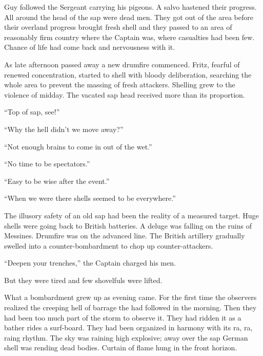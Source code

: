 Guy followed the Sergeant carrying his pigeons. A salvo hastened their progress. All around the head of the sap were dead men. They got out of the area before their overland progress brought fresh shell and they passed to an area of reasonably firm country where the Captain was, where casualties had been few. Chance of life had come back and nervousness with it.

As late afternoon passed away a new drumfire commenced. Fritz, fearful of renewed concentration, started to shell with bloody deliberation, searching the whole area to prevent the massing of fresh attackers. Shelling grew to the violence of midday. The vacated sap head received more than its proportion.

``Top of sap, see!''

``Why the hell didn't we move away?''

``Not enough brains to come in out of the wet.''

``No time to be spectators.''

``Easy to be wise after the event.''

``When we were there shells seemed to be everywhere.''

The illusory safety of an old sap had been the reality of a measured target. Huge shells were going back to British batteries. A deluge was falling on the ruins of Messines. Drumfire was on the advanced line. The British artillery gradually swelled into a counter-bombardment to chop up counter-attackers.

``Deepen your trenches,'' the Captain charged his men.

But they were tired and few shovelfuls were lifted.

What a bombardment grew up as evening came. For the first time the observers realized the creeping hell of barrage the had followed in the morning. Then they had been too much part of the storm to observe it. They had ridden it as a bather rides a surf-board. They had been organized in harmony with its ra, ra, raing rhythm. The sky was raining high explosive; away over the sap German shell was rending dead bodies. Curtain of flame hung in the front horizon.
